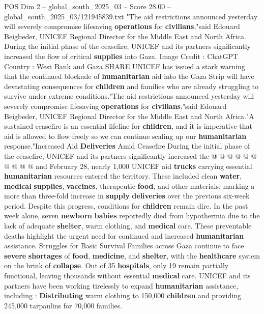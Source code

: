 \begin{textsample}{POS Dim 2 – global\_south\_2025\_03 – Score 28.00 – global\_south\_2025\_03/121945839.txt}  \label{ex:f2_pos_301}
"The aid restrictions announced yesterday will severely compromise lifesaving \textbf{operations} for \textbf{civilians},"said Edouard Beigbeder, UNICEF Regional Director for the Middle East and North Africa.
During the initial phase of the ceasefire, UNICEF and its partners significantly increased the flow of critical \textbf{supplies} into Gaza.
Image Credit : ChatGPT Country : West Bank and Gaza SHARE UNICEF has issued a stark warning that the continued blockade of \textbf{humanitarian} aid into the Gaza Strip will have devastating consequences for \textbf{children} and families who are already struggling to survive under extreme conditions."The aid restrictions announced yesterday will severely compromise lifesaving \textbf{operations} for \textbf{civilians},"said Edouard Beigbeder, UNICEF Regional Director for the Middle East and North Africa."A sustained ceasefire is an essential lifeline for \textbf{children}, and it is imperative that aid is allowed to flow freely so we can continue scaling up our \textbf{humanitarian} response."Increased Aid \textbf{Deliveries} Amid Ceasefire During the initial phase of the ceasefire, UNICEF and its partners significantly increased the @ @ @ @ @ @ @ @ @ @ and February 28, nearly 1,000 UNICEF aid \textbf{trucks} carrying essential \textbf{humanitarian} resources entered the territory.
These included clean \textbf{water}, \textbf{medical} \textbf{supplies}, \textbf{vaccines}, therapeutic \textbf{food}, and other materials, marking a more than three-fold increase in \textbf{supply} \textbf{deliveries} over the previous six-week period.
Despite this progress, conditions for \textbf{children} remain dire.
In the past week alone, seven \textbf{newborn} \textbf{babies} reportedly died from hypothermia due to the lack of adequate \textbf{shelter}, warm clothing, and \textbf{medical} care.
These preventable deaths highlight the urgent need for continued and increased \textbf{humanitarian} assistance.
Struggles for Basic Survival Families across Gaza continue to face \textbf{severe} \textbf{shortages} of \textbf{food}, \textbf{medicine}, and \textbf{shelter}, with the \textbf{healthcare} system on the brink of \textbf{collapse}.
Out of 35 \textbf{hospitals}, only 19 remain partially functional, leaving thousands without essential \textbf{medical} care.
UNICEF and its partners have been working tirelessly to expand \textbf{humanitarian} assistance, including : \textbf{Distributing} warm clothing to 150,000 \textbf{children} and providing 245,000 tarpaulins for 70,000 families.

\end{textsample}
